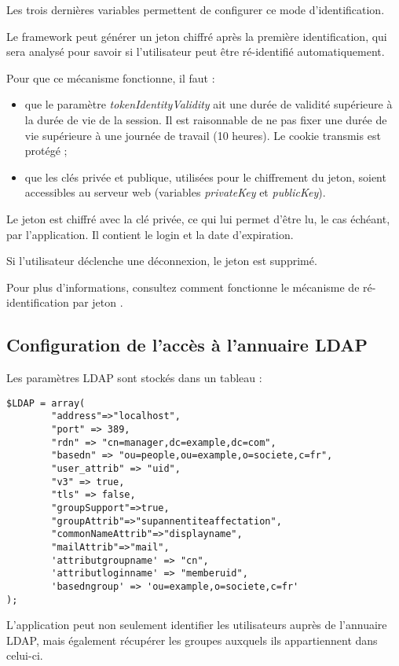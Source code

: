 Les trois dernières variables permettent de configurer ce mode d'identification. 

Le framework peut générer un jeton chiffré après la première identification, qui sera analysé pour savoir si l'utilisateur peut être ré-identifié automatiquement.

Pour que ce mécanisme fonctionne, il faut :
\begin{itemize}
\item que le paramètre \textit{tokenIdentityValidity} ait une durée de validité supérieure à la durée de vie de la session. Il est raisonnable de ne pas fixer une durée de vie supérieure à une journée de travail (10 heures). Le cookie transmis est protégé ;
\item que les clés privée et publique, utilisées pour le chiffrement du jeton, soient accessibles au serveur web (variables \textit{privateKey} et \textit{publicKey}).
\end{itemize}

Le jeton est chiffré avec la clé privée, ce qui lui permet d'être lu, le cas échéant, par l'application. Il contient le login et la date d'expiration. 

Si l'utilisateur déclenche une déconnexion, le jeton est supprimé.

Pour plus d'informations, consultez comment fonctionne le mécanisme de ré-identification par jeton \cite{token}.

\subsection{Configuration de l'accès à l'annuaire LDAP}

Les paramètres LDAP sont stockés dans un tableau :
\begin{lstlisting}
$LDAP = array(
		"address"=>"localhost",
		"port" => 389,
		"rdn" => "cn=manager,dc=example,dc=com",
		"basedn" => "ou=people,ou=example,o=societe,c=fr",
		"user_attrib" => "uid",
		"v3" => true,
		"tls" => false,
		"groupSupport"=>true,
		"groupAttrib"=>"supannentiteaffectation",
		"commonNameAttrib"=>"displayname",
		"mailAttrib"=>"mail",
		'attributgroupname' => "cn",
		'attributloginname' => "memberuid",
		'basedngroup' => 'ou=example,o=societe,c=fr'
);
\end{lstlisting}


L'application peut non seulement identifier les utilisateurs auprès de l'annuaire LDAP, mais également récupérer les groupes auxquels ils appartiennent dans celui-ci.

